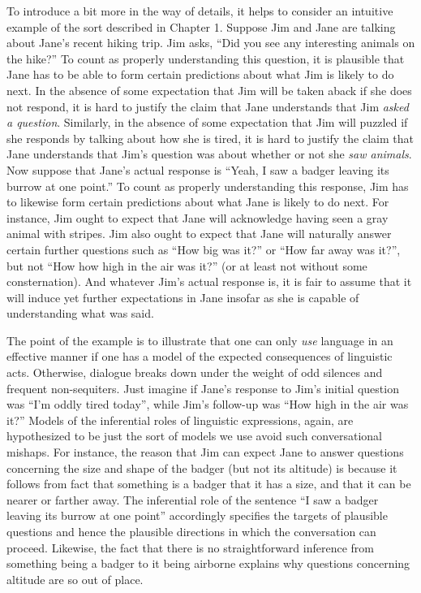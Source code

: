 To introduce a bit more in the way of details, it helps to consider an intuitive example of the sort described in Chapter 1. Suppose Jim and Jane are talking about Jane's recent hiking trip. Jim asks, ``Did you see any interesting animals on the hike?'' To count as properly understanding this question, it is plausible that Jane has to be able to form certain predictions about what Jim is likely to do next. In the absence of some expectation that Jim will be taken aback if she does not respond, it is hard to justify the claim that Jane understands that Jim \textit{asked a question}. Similarly, in the absence of some expectation that Jim will puzzled if she responds by talking about how she is tired, it is hard to justify the claim that Jane understands that Jim's question was about whether or not she \textit{saw animals}. Now suppose that Jane's actual response is ``Yeah, I saw a badger leaving its burrow at one point.'' To count as properly understanding this response, Jim has to likewise form certain predictions about what Jane is likely to do next. For instance, Jim ought to expect that Jane will acknowledge having seen a gray animal with stripes. Jim also ought to expect that Jane will naturally answer certain further questions such as ``How big was it?'' or ``How far away was it?'', but not ``How how high in the air was it?'' (or at least not without some consternation). And whatever Jim's actual response is, it is fair to assume that it will induce yet further expectations in Jane insofar as she is capable of understanding what was said. 

The point of the example is to illustrate that one can only \textit{use} language in an effective manner if one has a model of the expected consequences of linguistic acts. Otherwise, dialogue breaks down under the weight of odd silences and frequent non-sequiters. Just imagine if Jane's response to Jim's initial question was ``I'm oddly tired today'', while Jim's follow-up was ``How high in the air was it?'' Models of the inferential roles of linguistic expressions, again, are hypothesized to be just the sort of models we use avoid such conversational mishaps. For instance, the reason that Jim can expect Jane to answer questions concerning the size and shape of the badger (but not its altitude) is because it follows from fact that something is a badger that it has a size, and that it can be nearer or farther away. The inferential role of the sentence ``I saw a badger leaving its burrow at one point'' accordingly specifies the targets of plausible questions and hence the plausible directions in which the conversation can proceed. Likewise, the fact that there is no straightforward inference from something being a badger to it being airborne explains why questions concerning altitude are so out of place.

